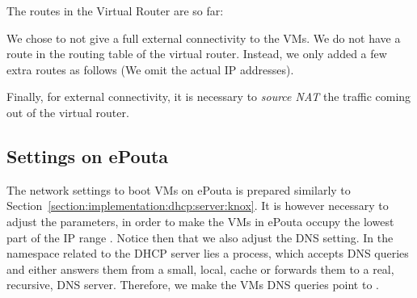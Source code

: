 
The routes in the Virtual Router are so far:


We chose to not give a full external connectivity to the VMs. We do
not have a  route in the routing table of the virtual
router. Instead, we only added a few extra routes as follows (We omit
the actual IP addresses).


Finally, for external connectivity, it is necessary to \emph{source
  NAT} the traffic coming out of the virtual router.


\subsection{Settings on ePouta}
\label{section:implementation:epouta}

The network settings to boot VMs on ePouta is prepared similarly to
Section~\ref{section:implementation:dhcp:server:knox}.
%
It is however necessary to adjust the parameters, in order to make the
VMs in ePouta occupy the lowest part of the IP range
.
%
Notice then that we also adjust the DNS setting. In the namespace
related to the DHCP server lies a  process, which accepts
DNS queries and either answers them from a small, local, cache or
forwards them to a real, recursive, DNS server. Therefore, we make the
VMs DNS queries point to .


